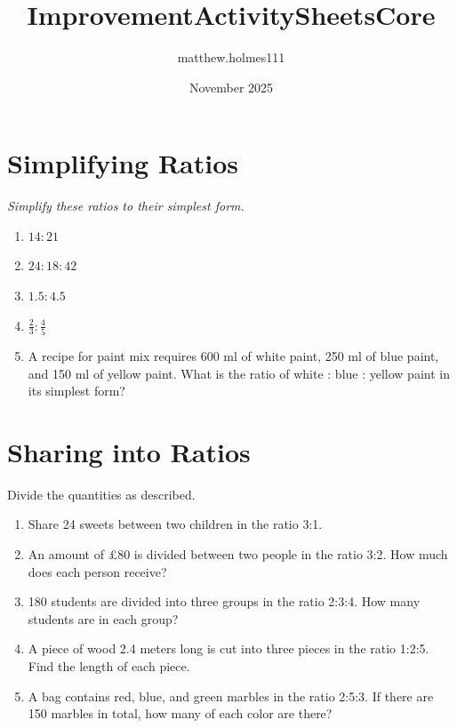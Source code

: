 \documentclass[12pt,a4paper]{article}
\title{ImprovementActivitySheetsCore}
\author{matthew.holmes111 }
\date{November 2025}
\begin{document}
\section*{Simplifying Ratios}
\emph{Simplify these ratios to their simplest form.}

\begin{enumerate}
\item \( 14 : 21 \)

\vspace{0.8cm}

\item \( 24 : 18 : 42 \)

\vspace{0.8cm}

\item \( 1.5 : 4.5 \)

\vspace{0.8cm}

\item \( \frac{2}{3} : \frac{4}{5} \)

\vspace{0.8cm}

\item A recipe for paint mix requires 600 ml of white paint, 250 ml of blue paint, and 150 ml of yellow paint. What is the ratio of white : blue : yellow paint in its simplest form?

\vspace{1.2cm}
\end{enumerate}

\vspace{3cm}

\section*{Sharing into Ratios}

Divide the quantities as described.

\begin{enumerate}
    \item Share 24 sweets between two children in the ratio 3:1.

    \item An amount of £80 is divided between two people in the ratio 3:2. How much does each person receive?

    \item 180 students are divided into three groups in the ratio 2:3:4. How many students are in each group?

    \item A piece of wood 2.4 meters long is cut into three pieces in the ratio 1:2:5. Find the length of each piece.

    \item A bag contains red, blue, and green marbles in the ratio 2:5:3. If there are 150 marbles in total, how many of each color are there?
\end{enumerate}
\end{document}
